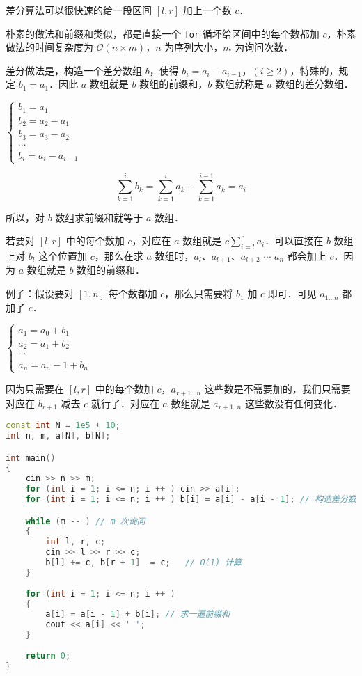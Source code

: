
差分算法可以很快速的给一段区间 $[l, r]$ 加上一个数 $c$．

朴素的做法和前缀和类似，都是直接一个 \verb|for| 循坏给区间中的每个数都加 $c$，朴素做法的时间复杂度为 $\mathcal{O}(n \times m)$，$n$ 为序列大小，$m$ 为询问次数．

差分做法是，构造一个差分数组 $b$，使得 $b_i = a_i - a_{i - 1}$，$(i \geq 2)$，特殊的，规定 $b_1 = a_1$．因此 $a$ 数组就是 $b$ 数组的前缀和，$b$ 数组就称是 $a$ 数组的差分数组．

$\begin{cases}
b_1 = a_1 \\
b_2 = a_2 - a_1 \\
b_3 = a_3 - a_2 \\
\cdots \\
b_i = a_i - a_{i - 1}
\end{cases}$

\begin{equation}
\sum^i_{k = 1}b_k = \sum^{i}_{k = 1} a_k - \sum^{i - 1}_{k = 1} a_k = a_i
\end{equation}

所以，对 $b$ 数组求前缀和就等于 $a$ 数组．

若要对 $[l, r]$ 中的每个数加 $c$，对应在 $a$ 数组就是 $c\sum^r_{i= l}a_i$．可以直接在 $b$ 数组上对 $b_l$ 这个位置加 $c$，那么在求 $a$ 数组时，$a_l$、$a_{l + 1}$、$a_{l + 2}$ $\cdots$ $a_n$ 都会加上 $c$．因为 $a$ 数组就是 $b$ 数组的前缀和．

例子：假设要对 $[1, n]$ 每个数都加 $c$，那么只需要将 $b_1$ 加 $c$ 即可．可见 $a_{1 ... n}$ 都加了 $c$．

$\begin{cases}
a_1 = a_0 + b_1 \\
a_2 = a_1 + b_2 \\
\cdots \\ 
a_n = a_n - 1 + b_n
\end{cases}$

因为只需要在 $[l, r]$ 中的每个数加 $c$，$a_{r + 1 ... n}$ 这些数是不需要加的，我们只需要对应在 $b_{r + 1}$ 减去 $c$ 就行了．对应在 $a$ 数组就是 $a_{r + 1..n}$ 这些数没有任何变化．

\begin{lstlisting}[language=cpp]
const int N = 1e5 + 10;
int n, m, a[N], b[N];

int main() 
{
    cin >> n >> m;  
    for (int i = 1; i <= n; i ++ ) cin >> a[i];
    for (int i = 1; i <= n; i ++ ) b[i] = a[i] - a[i - 1]; // 构造差分数组

    while (m -- ) // m 次询问
    {
        int l, r, c;
        cin >> l >> r >> c;
        b[l] += c, b[r + 1] -= c;   // O(1) 计算
    }
    
    for (int i = 1; i <= n; i ++ ) 
    {
        a[i] = a[i - 1] + b[i]; // 求一遍前缀和
        cout << a[i] << ' ';   
    }
    
    return 0;
}
\end{lstlisting}

